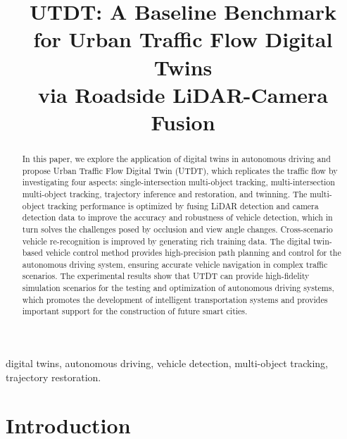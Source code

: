 \documentclass[journal,twoside,web]{ieeecolor}
\begin{document}
\title{UTDT: A Baseline Benchmark \\for Urban Traffic Flow Digital Twins \\via Roadside LiDAR-Camera Fusion}

\maketitle

\begin{abstract}
In this paper, we explore the application of digital twins in autonomous driving and propose Urban Traffic Flow Digital Twin (UTDT), which replicates the traffic flow by investigating four aspects: single-intersection multi-object tracking, multi-intersection multi-object tracking, trajectory inference and restoration, and twinning. 
The multi-object tracking performance is optimized by fusing LiDAR detection and camera detection data to improve the accuracy and robustness of vehicle detection, which in turn solves the challenges posed by occlusion and view angle changes. 
Cross-scenario vehicle re-recognition is improved by generating rich training data. 
The digital twin-based vehicle control method provides high-precision path planning and control for the autonomous driving system, ensuring accurate vehicle navigation in complex traffic scenarios. 
The experimental results show that UTDT can provide high-fidelity simulation scenarios for the testing and optimization of autonomous driving systems, which promotes the development of intelligent transportation systems and provides important support for the construction of future smart cities.
\end{abstract}

\begin{IEEEkeywords}
digital twins, autonomous driving, vehicle detection, multi-object tracking, trajectory restoration.
\end{IEEEkeywords}

\section{Introduction}
\end{document}
